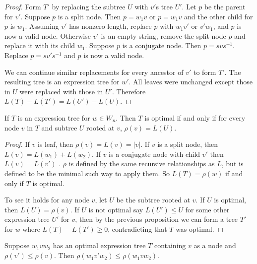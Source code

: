 \documentclass[12pt]{thesis}
\begin{document}
\begin{proof}
    Form $T'$ by replacing the subtree $U$ with $v'$s tree $U'$. 
    Let $p$ be the parent for $v'$.
    Suppose $p$ is a split node.
    Then $p = w_{1} v$ or $p = w_{1} v$
    and the other child for $p$ is $w_{1}$.
    Assuming $v'$ has nonzero length, replace $p$ with $w_{1} v'$ or $v' w_{1}$,
    and $p$ is now a valid node.
    Otherwise $v'$ is an empty string, remove the split node $p$
    and replace it with its child $w_{1}$.
    Suppose $p$ is a conjugate node.
    Then $p = svs^{-1}$.
    Replace $p = sv's^{-1}$ and $p$ is now a valid node.

    We can continue similar replacements for every ancestor of $v'$
    to form $T'$.
    The resulting tree is an expression tree for $w'$.
    All leaves were unchanged except those in $U$
    were replaced with those in $U'$.
    Therefore $L(T) - L(T')  = L(U') -  L(U)$.
\end{proof}



\begin{proposition}
    If $T$ is an expression tree for $w \in W_{n}$.
    Then $T$ is optimal if and only
    if for every node $v$
    in $T$ and subtree $U$ rooted at $v$,
    $\rho(v) = L(U)$.
\end{proposition}

\begin{proof}
    If $v$ is leaf,
    then $\rho(v) = L(v) = |v|$.
    If $v$ is a split node,
    then $L(v) = L(w_{1}) + L(w_{2})$.
    If $v$ is a conjugate node with child $v'$
    then $L(v) = L(v')$ .
    $\rho$ is defined by the same recursive
    relationships as $L$, but is defined to be the minimal
    such way to apply them.
    So $L(T) = \rho(w)$ if and only if $T$ is optimal.

    To see it holds for any node $v$,
    let $U$ be the subtree rooted at $v$.
    If $U$ is optimal, then $L(U) = \rho(v)$.
    If $U$ is not optimal say $L(U') \leq U$ for some other expression tree $U'$ for $v$, then by the previous proposition
    we can form a tree $T'$ for $w$ where $L(T) - L(T')  \geq 0$,
    contradicting that $T$ was optimal.
\end{proof}

\begin{corollary}
    \label{cor:tree-substitution}
    Suppose $w_{1}vw_{2}$ has an optimal expression
    tree $T$ containing $v$ as a node
    and $\rho(v') \leq \rho(v)$.
    Then $\rho(w_{1}v'w_{2}) \leq \rho(w_{1}vw_{2})$.
\end{corollary}
\end{document}
